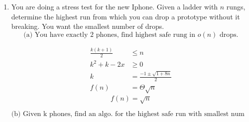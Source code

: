 \documentclass{article}
\begin{document}
\begin{enumerate}
\item You are doing a stress test for the new Iphone. Given a ladder with $n$ rungs, determine the highest run from which you can drop a prototype without it breaking. You want the smallest number of drops. 
\[
\text{(a) You have exactly 2 phones, find highest safe rung in } o(n) \text{ drops.}
\]

\begin{align*}
    \frac{k(k+1)}{2} & \leq n \\
    k^{2} + k -2x & \geq 0 \\
    k & = \frac{-1 \pm \sqrt{1 + 8n}}{2} \\
    f(n) & = \Theta{\sqrt{n}}
\end{align*}
\[
\boxed{ f(n) = \sqrt{n} }
\]


\[
\text{(b) Given k phones, find an algo. for the highest safe run with smallest num drops.}
\]

\end{enumerate}
\end{document}
